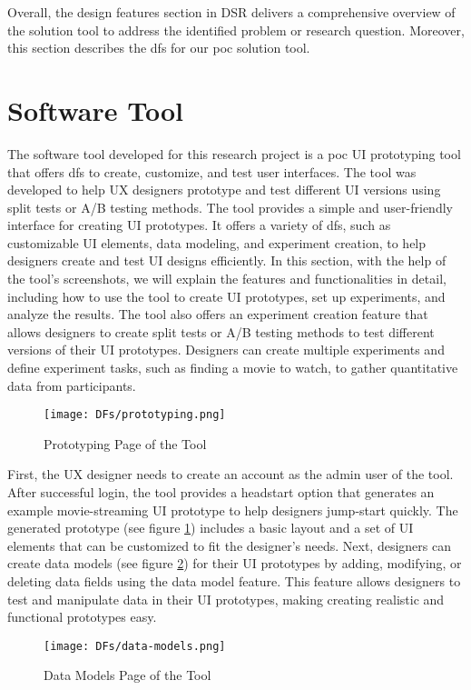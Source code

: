 Overall, the design features section in DSR delivers a comprehensive overview of the solution tool to address the identified problem or research question. 
Moreover, this section describes the \ac{df}s for our \ac{poc} solution tool.
\clearpage

\section{Software Tool}
\label{implementation:section:tool}
The software tool developed for this research project is a \ac{poc} UI prototyping tool that offers \ac{df}s to create, customize, and test user interfaces. 
The tool was developed to help UX designers prototype and test different UI versions using split tests or A/B testing methods. 
The tool provides a simple and user-friendly interface for creating UI prototypes. 
It offers a variety of \ac{df}s, such as customizable UI elements, data modeling, and experiment creation, to help designers create and test UI designs efficiently. 
In this section, with the help of the tool's screenshots, we will explain the features and functionalities in detail, including how to use the tool to create UI prototypes, set up experiments, and analyze the results.
The tool also offers an experiment creation feature that allows designers to create split tests or A/B testing methods to test different versions of their UI prototypes. 
Designers can create multiple experiments and define experiment tasks, such as finding a movie to watch, to gather quantitative data from participants.

\begin{figure}[ht]
    \centering
    \texttt{[image: DFs/prototyping.png]}
    \caption{Prototyping Page of the Tool}
    \label{implementation:fig:prototypingSol}
\end{figure}

First, the UX designer needs to create an account as the admin user of the tool. After successful login, the tool provides a headstart option that generates an example movie-streaming UI prototype to help designers jump-start quickly. 
The generated prototype (see figure \ref{implementation:fig:prototypingSol}) includes a basic layout and a set of UI elements that can be customized to fit the designer's needs.
Next, designers can create data models (see figure \ref{implementation:fig:datamodels}) for their UI prototypes by adding, modifying, or deleting data fields using the data model feature. 
This feature allows designers to test and manipulate data in their UI prototypes, making creating realistic and functional prototypes easy.
\begin{figure}[ht]
    \centering
    \texttt{[image: DFs/data-models.png]}
    \caption{Data Models Page of the Tool}
    \label{implementation:fig:datamodels}
\end{figure}

